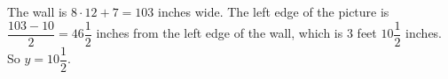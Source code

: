 The wall is $8\cdot12+7=103$ inches wide. The left edge of the picture is $\dfrac{103-10}{2}=46\dfrac12$ inches from the left edge of the wall, which is $3$ feet $10\dfrac12$ inches. So $y=\boxed{10\dfrac12}$.

